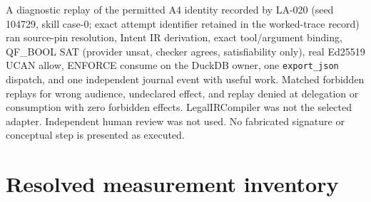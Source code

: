\documentclass{article}
\begin{document}
A diagnostic replay of the permitted A4 identity recorded by LA-020 (seed 104729, skill case-0; exact attempt identifier retained in the worked-trace record) ran source-pin resolution, Intent IR derivation, exact tool/argument binding, QF\_BOOL SAT (provider unsat, checker agrees, satisfiability only), real Ed25519 UCAN allow, ENFORCE consume on the DuckDB owner, one \texttt{export\_json} dispatch, and one independent journal event with useful work. Matched forbidden replays for wrong audience, undeclared effect, and replay denied at delegation or consumption with zero forbidden effects. LegalIRCompiler was not the selected adapter. Independent human review was not used. No fabricated signature or conceptual step is presented as executed.

\section{Resolved measurement inventory}
\end{document}
